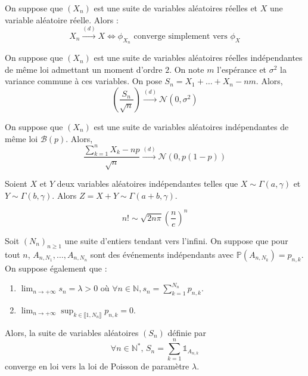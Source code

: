 
  \begin{theorem}[Lévy]
    On suppose que $(X_n)$ est une suite de variables aléatoires réelles et $X$ une variable aléatoire réelle. Alors :
    \[ X_n \overset{(d)}{\longrightarrow} X \iff \phi_{X_n} \text{ converge simplement vers } \phi_X \]
  \end{theorem}


  \begin{theorem}
    On suppose que $(X_n)$ est une suite de variables aléatoires réelles indépendantes de même loi admettant un moment d'ordre $2$. On note $m$ l'espérance et $\sigma^2$ la variance commune à ces variables. On pose $S_n = X_1 + \dots + X_n - nm$. Alors,
    \[ \left ( \frac{S_n}{\sqrt{n}} \right) \overset{(d)}{\longrightarrow} \mathcal{N}(0, \sigma^2) \]
  \end{theorem}

  \begin{application}
    On suppose que $(X_n)$ est une suite de variables aléatoires indépendantes de même loi $\mathcal{B}(p)$. Alors,
    \[ \frac{\sum_{k=1}^{n} X_k - np}{\sqrt{n}} \overset{(d)}{\longrightarrow} \mathcal{N}(0, p(1-p)) \]
  \end{application}


  \begin{lemma}
    Soient $X$ et $Y$ deux variables aléatoires indépendantes telles que $X \sim \Gamma(a, \gamma)$ et $Y \sim \Gamma(b, \gamma)$. Alors $Z = X + Y \sim \Gamma(a+b, \gamma)$.
  \end{lemma}


  \begin{application}
    \[ n! \sim \sqrt{2n\pi} \left(\frac{n}{e} \right)^n \]
  \end{application}


  \begin{application}
    Soit $(N_n)_{n \geq 1}$ une suite d'entiers tendant vers l'infini. On suppose que pour tout $n$, $A_{n,N_1}, \dots , A_{n,N_n}$ sont des événements indépendants avec $\mathbb{P}(A_{n,N_k}) = p_{n,k}$. On suppose également que :
    \begin{enumerate}[label=(\roman*)]
      \item $\lim_{n \rightarrow +\infty} s_n = \lambda > 0$ où $\forall n \in \mathbb{N}, s_n = \sum_{k=1}^{N_n} p_{n,k}$.
      \item $\lim_{n \rightarrow +\infty} \sup_{k \in \llbracket 1, N_n \rrbracket} p_{n,k} = 0$.
    \end{enumerate}
    Alors, la suite de variables aléatoires $(S_n)$ définie par
    \[ \forall n \in \mathbb{N}^*, \, S_n = \sum_{k=1}^n \mathbb{1}_{A_{n,k}} \]
    converge en loi vers la loi de Poisson de paramètre $\lambda$.
  \end{application}

